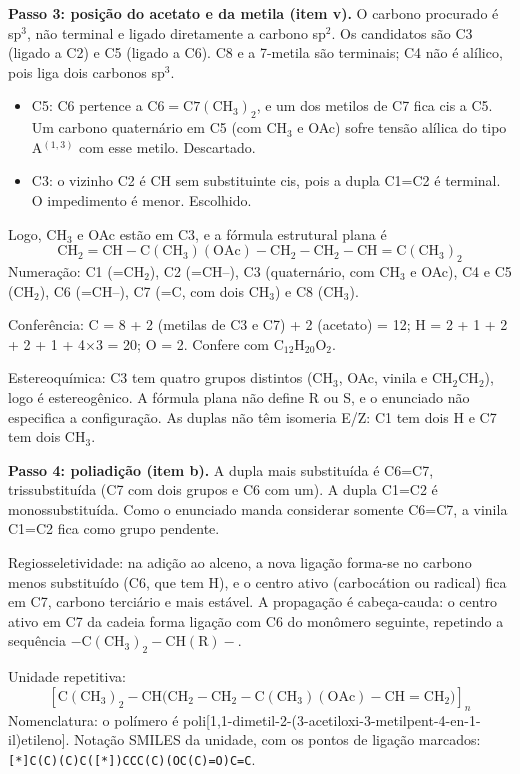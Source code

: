 \documentclass{article}%
\begin{document}
\textbf{Passo 3: posição do acetato e da metila (item v).} O carbono procurado é sp$^3$, não terminal e ligado diretamente a carbono sp$^2$. Os candidatos são C3 (ligado a C2) e C5 (ligado a C6). C8 e a 7-metila são terminais; C4 não é alílico, pois liga dois carbonos sp$^3$.
\begin{itemize}
\item C5: C6 pertence a $\mathrm{C6{=}C7(CH_3)_2}$, e um dos metilos de C7 fica cis a C5. Um carbono quaternário em C5 (com CH$_3$ e OAc) sofre tensão alílica do tipo A$^{(1,3)}$ com esse metilo. Descartado.
\item C3: o vizinho C2 é CH sem substituinte cis, pois a dupla C1=C2 é terminal. O impedimento é menor. Escolhido.
\end{itemize}
Logo, CH$_3$ e OAc estão em C3, e a fórmula estrutural plana é
\[
\mathrm{CH_2{=}CH{-}C(CH_3)(OAc){-}CH_2{-}CH_2{-}CH{=}C(CH_3)_2}
\]
Numeração: C1 (=CH$_2$), C2 (=CH--), C3 (quaternário, com CH$_3$ e OAc), C4 e C5 (CH$_2$), C6 (=CH--), C7 (=C, com dois CH$_3$) e C8 (CH$_3$).

Conferência: C = 8 + 2 (metilas de C3 e C7) + 2 (acetato) = 12; H = 2 + 1 + 2 + 2 + 1 + 4$\times$3 = 20; O = 2. Confere com $\mathrm{C_{12}H_{20}O_2}$.

Estereoquímica: C3 tem quatro grupos distintos (CH$_3$, OAc, vinila e CH$_2$CH$_2$), logo é estereogênico. A fórmula plana não define R ou S, e o enunciado não especifica a configuração. As duplas não têm isomeria E/Z: C1 tem dois H e C7 tem dois CH$_3$.

\textbf{Passo 4: poliadição (item b).} A dupla mais substituída é C6=C7, trissubstituída (C7 com dois grupos e C6 com um). A dupla C1=C2 é monossubstituída. Como o enunciado manda considerar somente C6=C7, a vinila C1=C2 fica como grupo pendente.

Regiosseletividade: na adição ao alceno, a nova ligação forma-se no carbono menos substituído (C6, que tem H), e o centro ativo (carbocátion ou radical) fica em C7, carbono terciário e mais estável. A propagação é cabeça-cauda: o centro ativo em C7 da cadeia forma ligação com C6 do monômero seguinte, repetindo a sequência $-\mathrm{C(CH_3)_2{-}CH(R)}-$.

Unidade repetitiva:
\[
\left[\mathrm{C(CH_3)_2{-}CH\bigl(CH_2{-}CH_2{-}C(CH_3)(OAc){-}CH{=}CH_2\bigr)}\right]_n
\]
Nomenclatura: o polímero é poli[1,1-dimetil-2-(3-acetiloxi-3-metilpent-4-en-1-il)etileno]. Notação SMILES da unidade, com os pontos de ligação marcados: \texttt{[*]C(C)(C)C([*])CCC(C)(OC(C)=O)C=C}.
\end{document}
